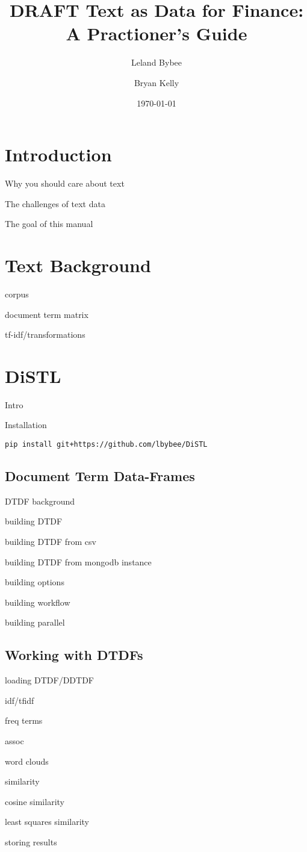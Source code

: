 \documentclass{article}
\begin{document}
\title{\textbf{DRAFT} Text as Data for Finance: A Practioner's Guide}

\date{\today}

\author{Leland Bybee \and Bryan Kelly}

\maketitle


\tableofcontents

\section{Introduction}

Why you should care about text

The challenges of text data

The goal of this manual

\section{Text Background}

corpus

document term matrix

tf-idf/transformations

\section{DiSTL}

Intro

Installation

\begin{verbatim}
pip install git+https://github.com/lbybee/DiSTL
\end{verbatim}

\subsection{Document Term Data-Frames}

DTDF background

building DTDF

building DTDF from csv

building DTDF from mongodb instance

building options

building workflow

building parallel

\subsection{Working with DTDFs}

loading DTDF/DDTDF

idf/tfidf

freq terms

assoc

word clouds

similarity

cosine similarity

least squares similarity

storing results
\end{document}

